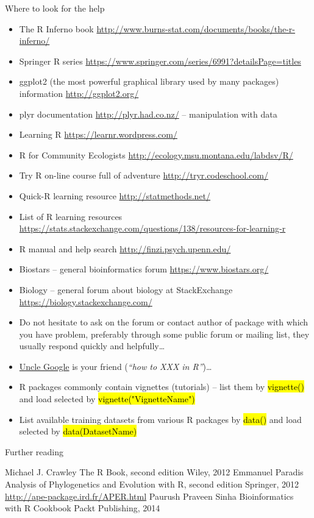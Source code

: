 \documentclass[compress, ucs, xelatex, 11pt, xcolor=svgnames,
  hyperref={
    bookmarks=true,
    unicode=true,
    colorlinks=true,
    pdftitle={Molecular data in R},
    plainpages=false,
    pdfauthor={Vojtech Zeisek},
    pdfsubject={Course about phylogeny and evolution in R},
    pdfcreator={XeLaTeX},
    pdfkeywords={R, evolution, phylogeny, molecular data},
    linkcolor=Tomato,
    anchorcolor=SaddleBrown,
    citecolor=Goldenrod,
    filecolor=DarkMagenta,
    menucolor=Sienna,
    urlcolor=DarkTurquoise,
    pdftex},
  url={hyphens, lowtilde} %
  ]{beamer}
\renewcommand{\texttt}[1]{\hl{\ttfamily #1}}
\begin{document}
\begin{frame}[allowframebreaks]{Where to look for the help}
\begin{itemize}
 \item The R Inferno book \url{http://www.burns-stat.com/documents/books/the-r-inferno/}
 \item Springer R series \url{https://www.springer.com/series/6991?detailsPage=titles}
 \item ggplot2 (the most powerful graphical library used by many packages) information \url{http://ggplot2.org/}
 \item plyr documentation \url{http://plyr.had.co.nz/} -- manipulation with data
 \item Learning R \url{https://learnr.wordpress.com/}
 \item R for Community Ecologists \url{http://ecology.msu.montana.edu/labdsv/R/}
 \item Try R on-line course full of adventure \url{http://tryr.codeschool.com/}
 \item Quick-R learning resource \url{http://statmethods.net/}
 \item List of R learning resources \url{https://stats.stackexchange.com/questions/138/resources-for-learning-r}
 \item R manual and help search \url{http://finzi.psych.upenn.edu/}
 \item Biostars -- general bioinformatics forum \url{https://www.biostars.org/}
 \item Biology -- general forum about biology at StackExchange \url{https://biology.stackexchange.com/}
 \item Do not hesitate to ask on the forum or contact author of package with which you have problem, preferably through some public forum or mailing list, they usually respond quickly and helpfully\ldots
 \item \href{http://rseek.org/}{Uncle Google} is your friend (\textit{``how to XXX in R''})\ldots
 \item R packages commonly contain vignettes (tutorials) -- list them by \texttt{vignette()} and load selected by \texttt{vignette("VignetteName")}
 \item List available training datasets from various R packages by \texttt{data()} and load selected by \texttt{data(DatasetName)}
\end{itemize}
\end{frame}

\begin{frame}{Further reading}
\begin{thebibliography}{1}
    Michael J. Crawley
    \newblock The R Book, second edition
    \newblock Wiley, 2012
    Emmanuel Paradis
    \newblock Analysis of Phylogenetics and Evolution with R, second edition
    \newblock Springer, 2012
    \newblock \url{http://ape-package.ird.fr/APER.html}
    Paurush Praveen Sinha
    \newblock Bioinformatics with R Cookbook
    \newblock Packt Publishing, 2014
\end{thebibliography}
\end{frame}
\end{document}
